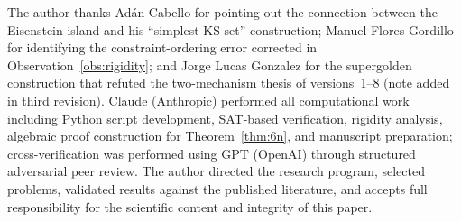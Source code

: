 \documentclass[12pt,a4paper]{article}
\begin{document}
The author thanks Ad\'an Cabello for pointing out the connection between the Eisenstein island and his ``simplest KS set'' construction; Manuel Flores Gordillo for identifying the constraint-ordering error corrected in Observation~\ref{obs:rigidity}; and Jorge Lucas Gonzalez for the supergolden construction that refuted the two-mechanism thesis of versions~1--8 (note added in third revision).  Claude (Anthropic) performed all computational work including Python script development, SAT-based verification, rigidity analysis, algebraic proof construction for Theorem~\ref{thm:6n}, and manuscript preparation; cross-verification was performed using GPT (OpenAI) through structured adversarial peer review.  The author directed the research program, selected problems, validated results against the published literature, and accepts full responsibility for the scientific content and integrity of this paper.
\end{document}

